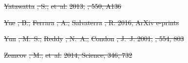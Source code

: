 \documentclass[numberedappendix]{emulateapj}
\providecommand{\DIFdel}[1]{{\protect\color{red}\sout{#1}}}                      %
\providecommand{\DIFaddbegin}{} %
\providecommand{\DIFaddend}{} %
\providecommand{\DIFdelend}{} %
\begin{document}
\DIFdel{Yatawatta}%
\DIFdel{, S., }%
\DIFdel{et~al.}%
\DIFdel{2013, }%
\DIFdel{, 550, A136
}%

\DIFdel{Yue}%
\DIFdel{, B., }%
\DIFdel{Ferrara}%
\DIFdel{, A., }%
\DIFdel{Salvaterra}%
\DIFdel{, R. 2016, ArXiv e-prints
}%

\DIFdel{Yun}%
\DIFdel{, M.~S., }%
\DIFdel{Reddy}%
\DIFdel{, N.~A., }%
\DIFdel{Condon}%
\DIFdel{, J.~J. 2001, }%
\DIFdel{, 554, 803
}%

\DIFdel{Zemcov}%
\DIFdel{, M., }%
\DIFdel{et~al.}%
\DIFdel{2014, Science, 346, 732
}%

\DIFdelend \DIFaddbegin 
\DIFaddend 
\end{document}
